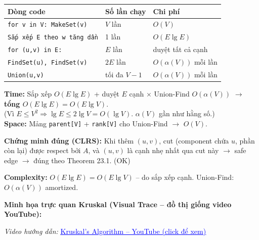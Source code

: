 \documentclass[10pt]{article}
\begin{document}
\begin{tcolorbox}[colback=yellow!5, colframe=orange!50, boxrule=0.5pt, arc=2pt, title={\small\textbf{Phân tích Complexity -- Kruskal's Algorithm}}]
\begin{tabular}{|l|l|l|}
\hline
\textbf{Dòng code} & \textbf{Số lần chạy} & \textbf{Chi phí} \\
\hline
\texttt{for v in V: MakeSet(v)} & $V$ lần & $O(V)$ \\
\hline
\texttt{Sắp xếp E theo w tăng dần} & 1 lần & $O(E\lg E)$ \\
\hline
\texttt{for (u,v) in E:} & $E$ lần & duyệt tất cả cạnh \\
\hline
\quad \texttt{FindSet(u), FindSet(v)} & $2E$ lần & $O(\alpha(V))$ mỗi lần \\
\hline
\quad \texttt{Union(u,v)} & tối đa $V-1$ & $O(\alpha(V))$ mỗi lần \\
\hline
\end{tabular}
\vspace{0.2cm}

\textbf{Time:} Sắp xếp $O(E\lg E)$ + duyệt $E$ cạnh $\times$ Union-Find $O(\alpha(V))$ $\to$ \textbf{tổng $O(E\lg E) = O(E\lg V)$}.\\
{\small (Vì $E \leq V^2 \Rightarrow \lg E \leq 2\lg V = O(\lg V)$. $\alpha(V)$ gần như hằng số.)}\\
\textbf{Space:} Mảng \texttt{parent[V]} + \texttt{rank[V]} cho Union-Find $\to$ $O(V)$.
\end{tcolorbox}

\textbf{Chứng minh đúng (CLRS):} Khi thêm \((u,v)\), cut (component chứa
\(u\), phần còn lại) được respect bởi \(A\), và \((u,v)\) là cạnh nhẹ
nhất qua cut này \(\to\) safe edge \(\to\) đúng theo Theorem 23.1. (OK)

\textbf{Complexity:} \(O(E \lg E) = O(E \lg V)\) -- do sắp xếp cạnh.
Union-Find: \(O(\alpha(V))\) amortized.

\textbf{Minh họa trực quan Kruskal (Visual Trace -- đồ thị giống video YouTube):}

\begin{center}
\textit{Video hướng dẫn:} \href{https://www.youtube.com/watch?v=71UQH7Pr9kU}{\textcolor{blue}{\underline{Kruskal's Algorithm -- YouTube (click để xem)}}}
\end{center}
\end{document}
